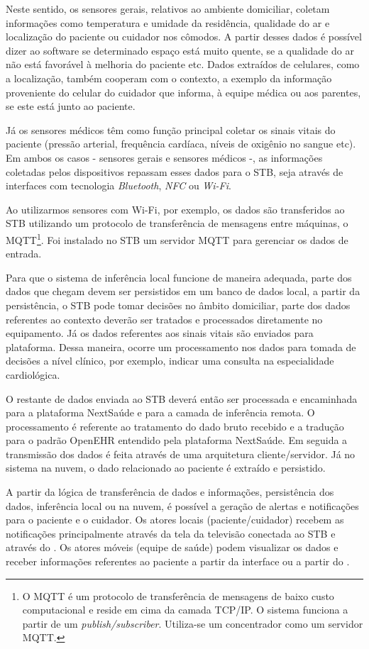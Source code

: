 Neste sentido, os sensores gerais, relativos ao ambiente domiciliar, coletam
informações como  temperatura e umidade da residência, qualidade do ar e
localização do paciente ou cuidador nos cômodos. A partir desses dados é
possível dizer ao software se determinado espaço está muito quente, se a
qualidade do ar não está favorável à melhoria do paciente etc. Dados extraídos
de celulares, como a localização, também cooperam com o contexto, a exemplo da
informação proveniente do celular do cuidador que informa, à equipe médica ou
aos parentes, se este está junto ao paciente.

Já os sensores médicos têm como função principal coletar os sinais vitais do
paciente (pressão arterial, frequência cardíaca, níveis de oxigênio no sangue
etc). Em ambos os casos - sensores gerais e sensores médicos -, as informações
coletadas pelos dispositivos repassam  esses dados para o STB, seja através de
interfaces com tecnologia  \textit{Bluetooth}, \textit{NFC} ou \textit{Wi-Fi}.

Ao utilizarmos sensores com Wi-Fi, por exemplo, os dados são transferidos ao
STB utilizando um protocolo de transferência de mensagens entre máquinas, o
MQTT\footnote{O MQTT é um protocolo de transferência de mensagens de baixo
custo computacional e reside em cima da camada TCP/IP. O sistema funciona a
partir de um \textit{publish/subscriber}. Utiliza-se um concentrador como um
servidor MQTT.}.  Foi instalado no STB um servidor MQTT para gerenciar os dados
de entrada.

Para que o sistema de inferência local funcione de maneira adequada, parte dos
dados que chegam devem ser persistidos em um banco de dados local, a partir da
persistência, o STB pode tomar decisões no âmbito domiciliar, parte dos dados
referentes ao contexto deverão ser tratados e processados diretamente no
equipamento.  Já os dados referentes aos sinais vitais são enviados para
plataforma. Dessa maneira, ocorre um processamento nos dados para tomada de
decisões a nível clínico, por exemplo, indicar uma consulta na especialidade
cardiológica.

O restante de dados enviada ao STB deverá então ser processada e encaminhada
para a plataforma NextSaúde e para a camada de inferência remota.  O
processamento é referente ao tratamento do dado bruto recebido e a tradução
para o padrão OpenEHR entendido pela plataforma NextSaúde. Em seguida a
transmissão dos dados é feita através de uma arquitetura  cliente/servidor. Já
no sistema na nuvem, o dado relacionado ao paciente é extraído e persistido.

A partir da lógica de transferência de dados e informações, persistência
dos dados, inferência local ou na nuvem, é possível a geração de alertas e
notificações para o paciente e o cuidador. Os atores locais (paciente/cuidador) 
recebem as notificações principalmente através da tela da televisão conectada ao 
STB e através do \smartphone. Os atores móveis (equipe de saúde) podem visualizar 
os dados e receber informações referentes ao paciente a partir da interface \web ou 
a partir do \smartphone.


